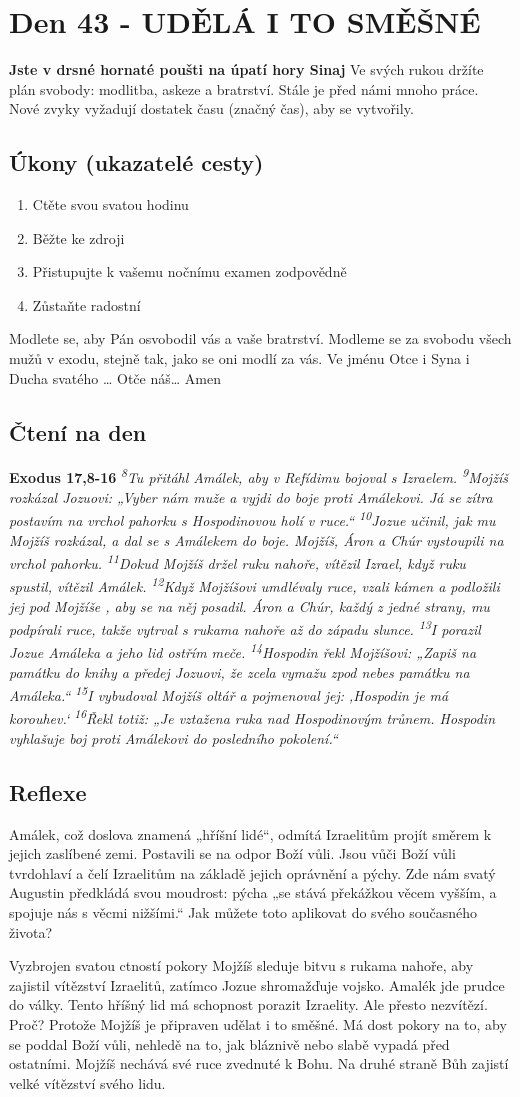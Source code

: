 \documentclass[11pt]{article}
\newcommand{\zacatekSedmyTyden}{
  \textbf{Jste v drsné hornaté poušti na úpatí hory Sinaj} \newline 
  Ve svých rukou držíte plán svobody: modlitba, askeze a bratrství. Stále je před námi mnoho práce. Nové zvyky vyžadují dostatek času (značný čas), aby se vytvořily.

  \subsection*{Úkony (ukazatelé cesty)}
\begin{enumerate}
  \item Ctěte svou svatou hodinu
  \item Běžte ke zdroji
  \item Přistupujte k vašemu nočnímu examen zodpovědně
  \item Zůstaňte radostní
\end{enumerate}
Modlete se, aby Pán osvobodil vás a vaše bratrství. \newline
Modleme se za svobodu všech mužů v exodu, stejně tak, jako se oni modlí za vás.\newline
Ve jménu Otce i Syna i Ducha svatého …  Otče náš… Amen
}
\begin{document}
\newpage
\section{Den 43 - UDĚLÁ I TO SMĚŠNÉ }
\zacatekSedmyTyden
\subsection*{Čtení na den}
\textbf{Exodus 17,8-16}
\newline
\textit{
\textsuperscript{8}Tu přitáhl Amálek, aby v Refídimu bojoval s Izraelem.
\textsuperscript{9}Mojžíš rozkázal Jozuovi: „Vyber nám muže a vyjdi do boje proti Amálekovi. Já se zítra postavím na vrchol pahorku s Hospodinovou holí v ruce.“
\textsuperscript{10}Jozue učinil, jak mu Mojžíš rozkázal, a dal se s Amálekem do boje. Mojžíš, Áron a Chúr vystoupili na vrchol pahorku.
\textsuperscript{11}Dokud Mojžíš držel ruku nahoře, vítězil Izrael, když ruku spustil, vítězil Amálek.
\textsuperscript{12}Když Mojžíšovi umdlévaly ruce, vzali kámen a podložili jej pod Mojžíše , aby se na něj posadil. Áron a Chúr, každý z jedné strany, mu podpírali ruce, takže vytrval s rukama nahoře až do západu slunce.
\textsuperscript{13}I porazil Jozue Amáleka a jeho lid ostřím meče.
\textsuperscript{14}Hospodin řekl Mojžíšovi: „Zapiš na památku do knihy a předej Jozuovi, že zcela vymažu zpod nebes památku na Amáleka.“
\textsuperscript{15}I vybudoval Mojžíš oltář a pojmenoval jej: ‚Hospodin je má korouhev.‘
\textsuperscript{16}Řekl totiž: „Je vztažena ruka nad Hospodinovým trůnem. Hospodin vyhlašuje boj proti Amálekovi do posledního pokolení.“
}

\subsection*{Reflexe}

Amálek, což doslova znamená „hříšní lidé“, odmítá Izraelitům projít směrem k jejich zaslíbené zemi. Postavili
se na odpor Boží vůli. Jsou vůči Boží vůli tvrdohlaví a čelí Izraelitům na základě jejich oprávnění a pýchy. Zde
nám svatý Augustin předkládá svou moudrost: pýcha „se stává překážkou věcem vyšším, a spojuje nás s věcmi
nižšími.“ Jak můžete toto aplikovat do svého současného života?

Vyzbrojen svatou ctností pokory Mojžíš sleduje bitvu s rukama nahoře, aby zajistil vítězství Izraelitů, zatímco
Jozue shromažďuje vojsko. Amalék jde prudce do války. Tento hříšný lid má schopnost porazit Izraelity. Ale
přesto nezvítězí. Proč? Protože Mojžíš je připraven udělat i to směšné. Má dost pokory na to, aby se poddal
Boží vůli, nehledě na to, jak bláznivě nebo slabě vypadá před ostatními. Mojžíš nechává své ruce zvednuté
k Bohu. Na druhé straně Bůh zajistí velké vítězství svého lidu.
\end{document}
